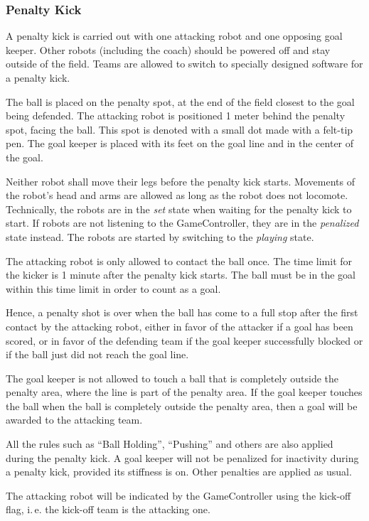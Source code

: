 \documentclass[12pt]{article}
\newcommand{\ie}{\mbox{i.\,e.}\xspace}
\begin{document}
\subsubsection{Penalty Kick}
\label{sec:penalty_kick}

A penalty kick is carried out with one attacking robot and one opposing goal keeper. Other robots (including the coach) should be powered off and stay outside of the field. Teams are allowed to switch to specially designed software for a penalty kick. 

The ball is placed on the penalty spot, at the end of the field closest to the goal being defended. The attacking robot is positioned 1 meter behind the penalty spot, facing the ball.  This spot is denoted with a small dot made with a felt-tip pen. The goal keeper is placed with its feet on the goal line and in the center of the goal.

Neither robot shall move their legs before the penalty kick starts. Movements of the robot's head and arms are allowed as long as the robot does not locomote. Technically, the robots are in the \emph{set} state when waiting for the penalty kick to start. If robots are not listening to the GameController, they are in the \emph{penalized} state instead. The robots are started by switching to the \emph{playing} state.

The attacking robot is only allowed to contact the ball once.  The time limit for the kicker is 1 minute after the penalty kick starts. The ball must be in the goal within this time limit in order to count as a goal.

Hence, a penalty shot is over when the ball has come to a full stop after the first contact by the attacking robot, either in favor of the attacker if a goal has been scored, or in favor of the defending team if the goal keeper successfully blocked or if the ball just did not reach the goal line.

The goal keeper is not allowed to touch a ball that is completely outside the penalty area, where the line is part of the penalty area. If the goal keeper touches the ball when the ball is completely outside the penalty area, then a goal will be awarded to the attacking team.

All the rules such as ``Ball Holding'', ``Pushing'' and others are also applied during the penalty kick.  A goal keeper will not be penalized for inactivity during a penalty kick, provided its stiffness is on. Other penalties are applied as usual.

The attacking robot will be indicated by the GameController using the kick-off flag, \ie the kick-off team is the attacking one.
\end{document}
